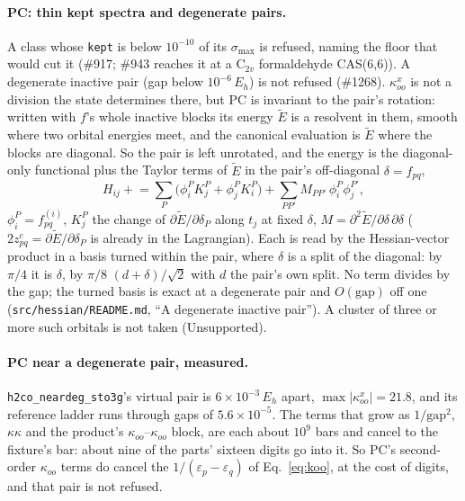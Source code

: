 \documentclass[11pt]{article}
\newcommand{\code}[1]{\texttt{#1}}
\newcommand{\eps}{\varepsilon}
\begin{document}
\paragraph{PC: thin kept spectra and degenerate pairs.} A class whose
\code{kept} is below $10^{-10}$ of its $\sigma_{\max}$ is refused, naming
the floor that would cut it (\#917; \#943 reaches it at a C$_{2v}$
formaldehyde CAS(6,6)). A degenerate inactive pair (gap below
$10^{-6}\,E_h$) is not refused (\#1268). $\kappa^x_{oo}$ is not a division the
state determines there, but PC is invariant to the pair's rotation: written
with $f$'s whole inactive blocks its energy $\tilde E$ is a resolvent in
them, smooth where two orbital energies meet, and the canonical evaluation
is $\tilde E$ where the blocks are diagonal. So the pair is left unrotated,
and the energy is the diagonal-only functional plus the Taylor terms of
$\tilde E$ in the pair's off-diagonal $\delta = f_{pq}$,
\begin{equation}
  H_{ij} \mathrel{+}= \sum_P \bigl(\phi^P_i K^P_j + \phi^P_j K^P_i\bigr)
    + \sum_{PP'} M_{PP'}\,\phi^P_i \phi^{P'}_j,
\end{equation}
$\phi^P_i = f^{(i)}_{pq}$, $K^P_j$ the change of $\partial\tilde E/\partial\delta_P$
along $t_j$ at fixed $\delta$, $M = \partial^2\tilde E/\partial\delta\,\partial\delta$
($2 z^c_{pq} = \partial\tilde E/\partial\delta_P$ is already in the
Lagrangian). Each is read by the Hessian-vector product in a basis turned
within the pair, where $\delta$ is a split of the diagonal: by $\pi/4$ it
is $\delta$, by $\pi/8$ $(d + \delta)/\sqrt2$ with $d$ the pair's own split.
No term divides by the gap; the turned basis is exact at a degenerate pair
and $O(\mathrm{gap})$ off one (\code{src/hessian/README.md}, ``A
degenerate inactive pair''). A cluster of three or more such orbitals is
not taken (Unsupported).

\paragraph{PC near a degenerate pair, measured.} \code{h2co\_neardeg\_sto3g}'s
virtual pair is $6\times10^{-3}\,E_h$ apart, $\max|\kappa^x_{oo}| = 21.8$, and
its reference ladder runs through gaps of $5.6\times10^{-5}$. The terms that
grow as $1/\mathrm{gap}^2$, $\kappa\kappa$ and the product's
$\kappa_{oo}$--$\kappa_{oo}$ block, are each about $10^9$ bars and cancel to
the fixture's bar: about nine of the parts' sixteen digits go into it. So
PC's second-order $\kappa_{oo}$ terms do cancel the $1/(\eps_p - \eps_q)$ of
Eq.~\eqref{eq:koo}, at the cost of digits, and that pair is not refused.
\end{document}
